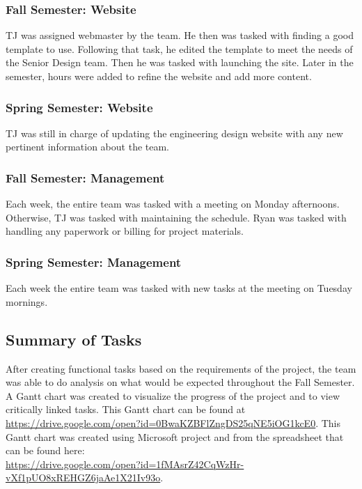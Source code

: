 \documentclass[PPFS.tex]{template/subfiles}
\begin{document}
\subsubsection{Fall Semester: Website}
TJ was assigned webmaster by the team. He then was tasked with finding a good template to use. Following that task, he edited the template to meet the needs of the Senior Design team. Then he was tasked with launching the site. Later in the semester, hours were added to refine the website and add more content.

\subsubsection{Spring Semester: Website}
TJ was still in charge of updating the engineering design website with any new pertinent information about the team.

\subsubsection{Fall Semester: Management}
Each week, the entire team was tasked with a meeting on Monday afternoons. Otherwise, TJ was tasked with maintaining the schedule. Ryan was tasked with handling any paperwork or billing for project materials.

\subsubsection{Spring Semester: Management}
Each week the entire team was tasked with new tasks at the meeting on Tuesday mornings.


\subsection{Summary of Tasks}

After creating functional tasks based on the requirements of the project, the team was able to do analysis on what would be expected throughout the Fall Semester. A Gantt chart was created to visualize the progress of the project and to view critically linked tasks.
This Gantt chart can be found at \textcolor{blue}{\underline{\url{https://drive.google.com/open?id=0BwaKZBFlZngDS25qNE5iOG1kcE0}}}. This Gantt chart was created using Microsoft project and from the spreadsheet that can be found here:\\ \textcolor{blue}{\underline{\url{https://drive.google.com/open?id=1fMAsrZ42CqWzHr-vXf1pUO8xREHGZ6jaAe1X21Iv93o}}}.
\end{document}
